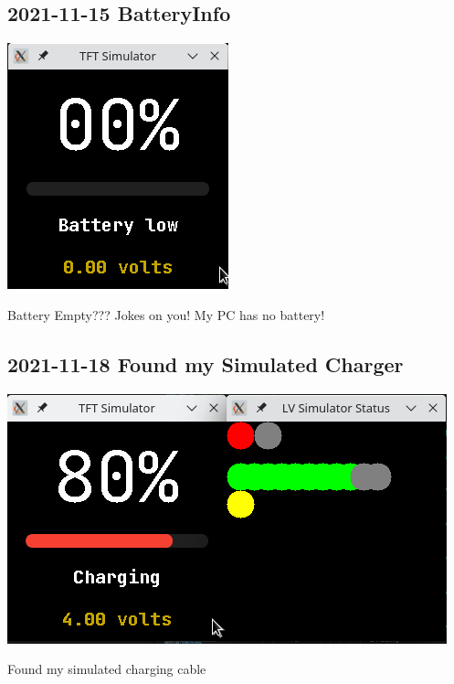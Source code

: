 \documentclass{beamer}
\begin{document}
\subsection{2021-11-15 BatteryInfo}
\begin{frame}{}
  \centering\includegraphics[height=0.8\paperheight]{../2021-11-15_BatteryInfo.png}

  Battery Empty??? Jokes on you! My PC has no battery!
\end{frame}

\subsection{2021-11-18 Found my Simulated Charger}
\begin{frame}{}
  \centering\includegraphics[width=\textwidth]{../2021-11-18_BatteryInfo_charging.png}

  Found my simulated charging cable
\end{frame}
\end{document}
